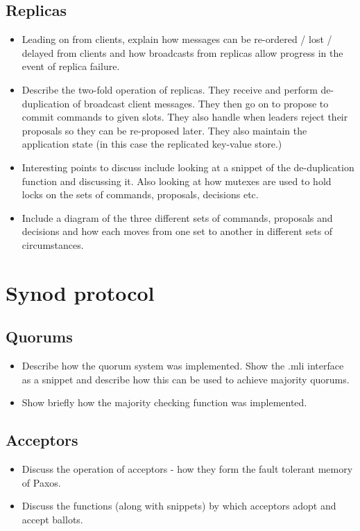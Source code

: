 \subsection{Replicas}
\begin{itemize}
  \item Leading on from clients, explain how messages can be re-ordered / lost / delayed from clients and how broadcasts from replicas allow progress in the event of replica failure.
  \item Describe the two-fold operation of replicas. They receive and perform de-duplication of broadcast client messages. They then go on to propose to commit commands to given slots. They also handle when leaders reject their proposals so they can be re-proposed later. They also maintain the application state (in this case the replicated key-value store.)
  \item Interesting points to discuss include looking at a snippet of the de-duplication function and discussing it. Also looking at how mutexes are used to hold locks on the sets of commands, proposals, decisions etc.
  \item Include a diagram of the three different sets of commands, proposals and decisions and how each moves from one set to another in different sets of circumstances.
\end{itemize}

\section{Synod protocol}

\subsection{Quorums}
\begin{itemize}
  \item Describe how the quorum system was implemented. Show the .mli interface as a snippet and describe how this can be used to achieve majority quorums.
  \item Show briefly how the majority checking function was implemented.
\end{itemize}

\subsection{Acceptors}
\begin{itemize}
  \item Discuss the operation of acceptors - how they form the fault tolerant memory of Paxos.
  \item Discuss the functions (along with snippets) by which acceptors adopt and accept ballots.
\end{itemize}

